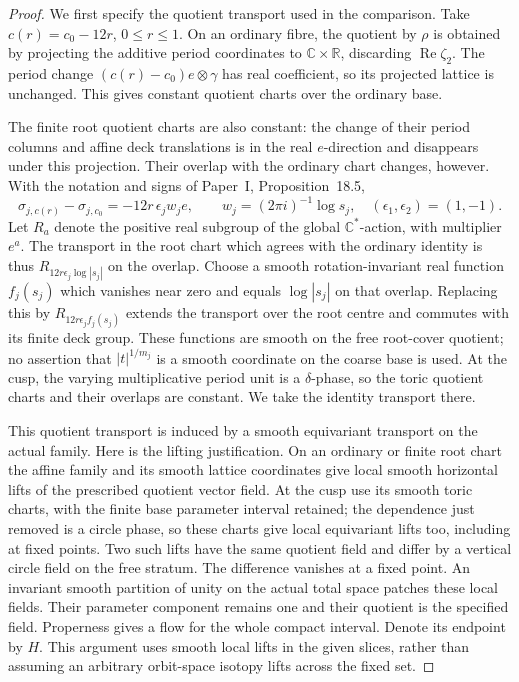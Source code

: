 \begin{proof}
We first specify the quotient transport used in the comparison.
Take $c(r)=c_0-12r$, $0\leq r\leq1$. On an ordinary fibre,
the quotient by $\rho$ is obtained by projecting the additive
period coordinates to $\mathbb C\times\mathbb R$, discarding
$\operatorname{Re}\zeta_2$. The period change
$(c(r)-c_0)e\otimes\gamma$ has real coefficient, so its
projected lattice is unchanged. This gives constant quotient
charts over the ordinary base.

The finite root quotient charts are also constant: the change of
their period columns and affine deck translations is in the real
$e$-direction and disappears under this projection. Their overlap
with the ordinary chart changes, however. With the notation and
signs of Paper~I, Proposition~18.5,
\[
 \sigma_{j,c(r)}-\sigma_{j,c_0}
       =-12r\,\epsilon_j w_j e,
 \qquad w_j=(2\pi i)^{-1}\log s_j,
 \quad (\epsilon_1,\epsilon_2)=(1,-1).
\]
Let $R_a$ denote the positive real subgroup of the global
$\mathbb C^*$-action, with multiplier $e^a$. The transport in
the root chart which agrees with the ordinary identity is thus
$R_{12r\epsilon_j\log|s_j|}$ on the overlap. Choose a smooth
rotation-invariant real function $f_j(s_j)$ which vanishes near
zero and equals $\log|s_j|$ on that overlap. Replacing this by
$R_{12r\epsilon_j f_j(s_j)}$ extends the transport over the
root centre and commutes with its finite deck group. These
functions are smooth on the free root-cover quotient; no assertion
that $|t|^{1/m_j}$ is a smooth coordinate on the coarse base is
used. At the cusp, the varying multiplicative period unit is a
$\delta$-phase, so the toric quotient charts and their overlaps
are constant. We take the identity transport there.

This quotient transport is induced by a smooth equivariant
transport on the actual family. Here is the lifting justification.
On an ordinary or finite root chart the affine family and its
smooth lattice coordinates give local smooth horizontal lifts of
the prescribed quotient vector field. At the cusp use its smooth
toric charts, with the finite base parameter interval retained;
the dependence just removed is a circle phase, so these charts
give local equivariant lifts too, including at fixed points.
Two such lifts have the same quotient field and differ by a
vertical circle field on the free stratum. The difference vanishes
at a fixed point. An invariant smooth partition of unity on the
actual total space patches these local fields. Their parameter
component remains one and their quotient is the specified field.
Properness gives a flow for the whole compact interval. Denote
its endpoint by $H$. This argument uses smooth local lifts in the
given slices, rather than assuming an arbitrary orbit-space
isotopy lifts across the fixed set.


\end{proof}
